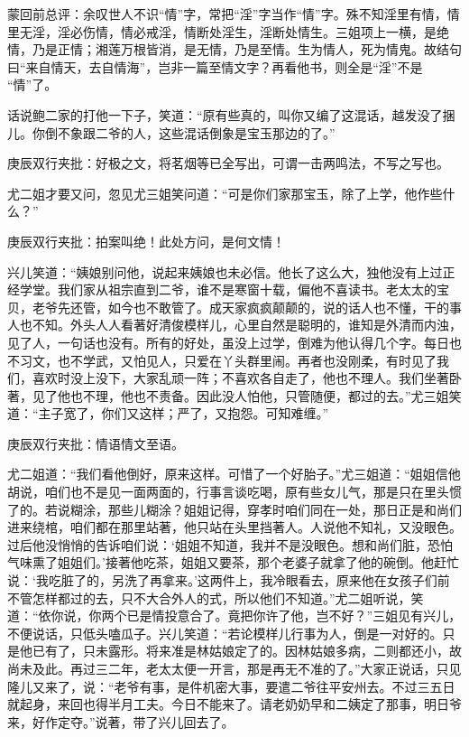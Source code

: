 
\begin{parag}
    \begin{note}蒙回前总评：余叹世人不识“情”字，常把“淫”字当作“情”字。殊不知淫里有情，情里无淫，淫必伤情，情必戒淫，情断处淫生，淫断处情生。三姐项上一横，是绝情，乃是正情；湘莲万根皆消，是无情，乃是至情。生为情人，死为情鬼。故结句曰“来自情天，去自情海”，岂非一篇至情文字？再看他书，则全是“淫”不是 “情”了。\end{note}
\end{parag}


\begin{parag}
    话说鲍二家的打他一下子，笑道：“原有些真的，叫你又编了这混话，越发没了捆儿。你倒不象跟二爷的人，这些混话倒象是宝玉那边的了。”\begin{note}庚辰双行夹批：好极之文，将茗烟等已全写出，可谓一击两鸣法，不写之写也。\end{note}尤二姐才要又问，忽见尤三姐笑问道：“可是你们家那宝玉，除了上学，他作些什么？”\begin{note}庚辰双行夹批：拍案叫绝！此处方问，是何文情！\end{note}兴儿笑道：“姨娘别问他，说起来姨娘也未必信。他长了这么大，独他没有上过正经学堂。我们家从祖宗直到二爷，谁不是寒窗十载，偏他不喜读书。老太太的宝贝，老爷先还管，如今也不敢管了。成天家疯疯颠颠的，说的话人也不懂，干的事人也不知。外头人人看著好清俊模样儿，心里自然是聪明的，谁知是外清而内浊，见了人，一句话也没有。所有的好处，虽没上过学，倒难为他认得几个字。每日也不习文，也不学武，又怕见人，只爱在丫头群里闹。再者也没刚柔，有时见了我们，喜欢时没上没下，大家乱顽一阵；不喜欢各自走了，他也不理人。我们坐著卧著，见了他也不理，他也不责备。因此没人怕他，只管随便，都过的去。”尤三姐笑道：“主子宽了，你们又这样；严了，又抱怨。可知难缠。”\begin{note}庚辰双行夹批：情语情文至语。\end{note}尤二姐道：“我们看他倒好，原来这样。可惜了一个好胎子。”尤三姐道：“姐姐信他胡说，咱们也不是见一面两面的，行事言谈吃喝，原有些女儿气，那是只在里头惯了的。若说糊涂，那些儿糊涂？姐姐记得，穿孝时咱们同在一处，那日正是和尚们进来绕棺，咱们都在那里站著，他只站在头里挡著人。人说他不知礼，又没眼色。过后他没悄悄的告诉咱们说：‘姐姐不知道，我并不是没眼色。想和尚们脏，恐怕气味熏了姐姐们。’接著他吃茶，姐姐又要茶，那个老婆子就拿了他的碗倒。他赶忙说：‘我吃脏了的，另洗了再拿来。’这两件上，我冷眼看去，原来他在女孩子们前不管怎样都过的去，只不大合外人的式，所以他们不知道。”尤二姐听说，笑道：“依你说，你两个已是情投意合了。竟把你许了他，岂不好？”三姐见有兴儿，不便说话，只低头嗑瓜子。兴儿笑道：“若论模样儿行事为人，倒是一对好的。只是他已有了，只未露形。将来准是林姑娘定了的。因林姑娘多病，二则都还小，故尚未及此。再过三二年，老太太便一开言，那是再无不准的了。”大家正说话，只见隆儿又来了，说：“老爷有事，是件机密大事，要遣二爷往平安州去。不过三五日就起身，来回也得半月工夫。今日不能来了。请老奶奶早和二姨定了那事，明日爷来，好作定夺。”说著，带了兴儿回去了。
\end{parag}


